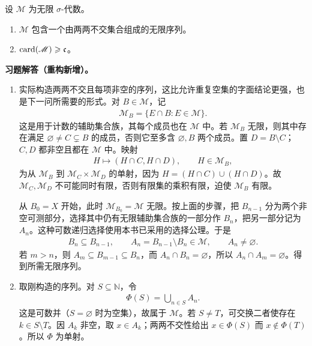 \documentclass[../../main.tex]{subfiles}%
\begin{document}
\begin{exercise}\label{exercise:ch01-infinite-sigma-algebra}
设 $\mathscr{M}$ 为无限 $\sigma$-代数。
\begin{enumerate}[label=\alph*.,ref=(\alph*)]
\item\label{item:ch01-infinite-sigma-disjoint} $\mathscr{M}$ 包含一个由两两不交集合组成的无限序列。
\item\label{item:ch01-infinite-sigma-cardinality} $\operatorname{card}(\mathscr{M})\geqslant\mathfrak{c}$。
\end{enumerate}
\end{exercise}
\begin{solution}
\label{solution:ch01-infinite-sigma-algebra}
\textbf{习题解答（重构新增）。}
\begin{enumerate}[label=\alph*.,ref=(\alph*)]
\item\label{item:ch01-infinite-sigma-solution-disjoint} 实际构造两两不交且每项非空的序列，这比允许重复空集的字面结论更强，也是下一问所需要的形式。对 $B\in\mathscr{M}$，记
\begin{align*}
\mathscr{M}_B=\{E\cap B:E\in\mathscr{M}\}.
\end{align*}
这是用于计数的辅助集合族，其每个成员也在 $\mathscr{M}$ 中。若 $\mathscr{M}_B$ 无限，则其中存在满足 $\varnothing\ne C\subsetneq B$ 的成员，否则它至多含 $\varnothing,B$ 两个成员。置 $D=B\setminus C$；$C,D$ 都非空且都在 $\mathscr{M}$ 中。映射
\begin{align*}
H\longmapsto(H\cap C,H\cap D),\qquad H\in\mathscr{M}_B,
\end{align*}
为从 $\mathscr{M}_B$ 到 $\mathscr{M}_C\times\mathscr{M}_D$ 的单射，因为 $H=(H\cap C)\cup(H\cap D)$。故 $\mathscr{M}_C,\mathscr{M}_D$ 不可能同时有限，否则有限集的乘积有限，迫使 $\mathscr{M}_B$ 有限。

从 $B_0=X$ 开始，此时 $\mathscr{M}_{B_0}=\mathscr{M}$ 无限。按上面的步骤，把 $B_{n-1}$ 分为两个非空可测部分，选择其中仍有无限辅助集合族的一部分作 $B_n$，把另一部分记为 $A_n$。这种可数递归选择使用本书已采用的选择公理。于是
\begin{align*}
B_n\subseteq B_{n-1},\qquad
A_n=B_{n-1}\setminus B_n\in\mathscr{M},\qquad A_n\ne\varnothing.
\end{align*}
若 $m>n$，则 $A_m\subseteq B_{m-1}\subseteq B_n$，而 $A_n\cap B_n=\varnothing$，所以 $A_n\cap A_m=\varnothing$。得到所需无限序列。
\item\label{item:ch01-infinite-sigma-solution-cardinality} 取刚构造的序列。对 $S\subseteq\mathbb{N}$，令
\begin{align*}
\Phi(S)=\bigcup_{n\in S}A_n.
\end{align*}
这是可数并（$S=\varnothing$ 时为空集），故属于 $\mathscr{M}$。若 $S\ne T$，可交换二者使存在 $k\in S\setminus T$。因 $A_k$ 非空，取 $x\in A_k$；两两不交性给出 $x\in\Phi(S)$ 而 $x\notin\Phi(T)$。所以 $\Phi$ 为单射。


\end{enumerate}
\end{solution}
\end{document}
